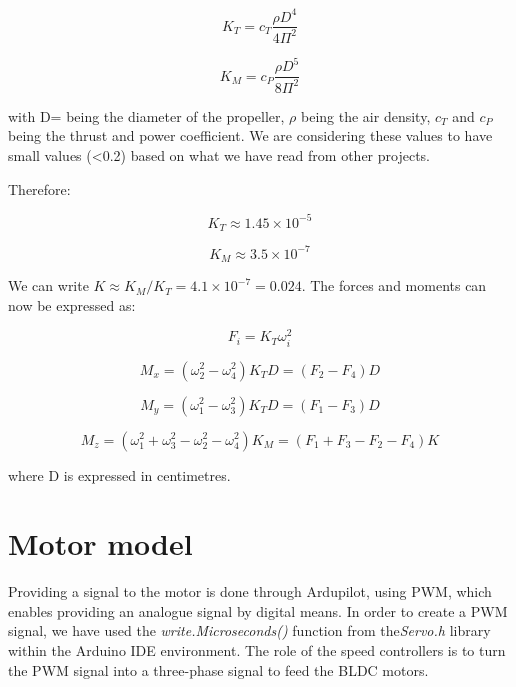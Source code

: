 \begin{equation}
	K_{T}=c_{T}\frac{\rho D^{4}}{4\Pi^{2}}
\end{equation}

\begin{equation}
	K_{M}=c_{P}\frac{\rho D^{5}}{8\Pi^{2}}
\end{equation}

with D= being the diameter of the propeller, $\rho$ being the air density, $ c_{T} $ and $ c_{P} $ being the thrust and power coefficient. We are considering these values to have small values (<0.2) based on what we have read from other projects.

Therefore:

\begin{equation}
	K_{T}\approx 1.45\times10^{-5}
\end{equation}

\begin{equation}
	K_{M} \approx 3.5\times10^{-7}
\end{equation}


We can write $K \approx K_{M}/K_{T}=4.1\times10^{-7}=0.024$. The forces and moments can now be expressed as:

\begin{equation}
\label{motor1} 
	F_{i}=K_{T}\omega_{i}^{2}
\end{equation}

\begin{equation}
\label{motor2} 
	M_{x}=(\omega_{2}^{2}-\omega_{4}^{2})K_{T}D=(F_{2}-F_{4})D
\end{equation}

\begin{equation}
\label{motor3} 
	M_{y}=(\omega_{1}^{2}-\omega_{3}^{2})K_{T}D=(F_{1}-F_{3})D
\end{equation}

\begin{equation}
\label{motor4} 
	M_{z}=(\omega_{1}^{2}+\omega_{3}^{2}-\omega_{2}^{2}-\omega_{4}^{2})K_{M}=(F_{1}+F_{3}-F_{2}-F_{4})K
\end{equation}

where D is expressed in centimetres.

\section{Motor model}
Providing a signal to the motor is done through Ardupilot, using PWM, which enables providing an analogue signal by digital means.  In order to create a PWM signal, we have used the \textit{write.Microseconds()} function from the\textit{Servo.h} library within the Arduino IDE environment. The role of the speed controllers is to turn the PWM signal into a three-phase signal to feed the BLDC motors.

